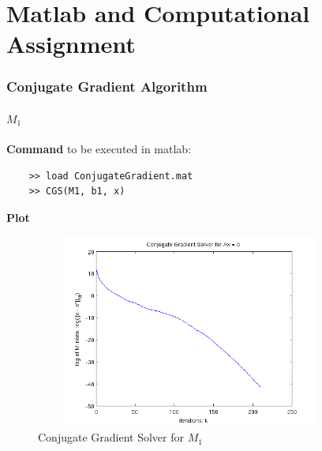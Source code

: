 \documentclass[11pt,a4paper]{article}
\begin{document}
\begin{titlepage}
    \maketitle
\end{titlepage}
\renewcommand{\contentsname}{Table of Contents}
\begin{center} 
    \tableofcontents 
    \listoffigures
\end{center}
\newpage

\part{Matlab and Computational Assignment}
\section{Conjugate Gradient Algorithm}
\subsection{$M_1$}
{\bf Command} to be executed in matlab:
\begin{verbatim}
    >> load ConjugateGradient.mat
    >> CGS(M1, b1, x)
\end{verbatim}
{\bf Plot}
\begin{figure}[h]
    \centering
    \includegraphics[width=4in,height=2.5in]{../ps4_matlab/M1.png}
    \caption{Conjugate Gradient Solver for $M_1$}
\end{figure}
\end{document}

